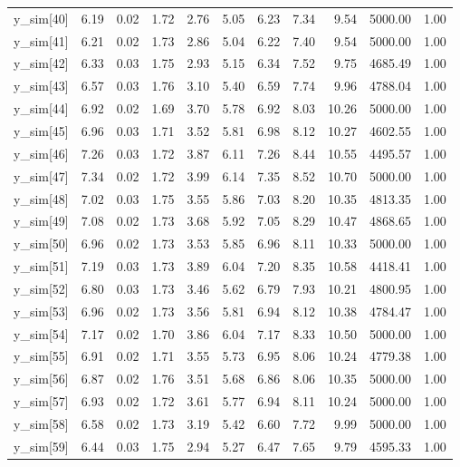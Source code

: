 \begin{table}[ht]
\begin{tabular}{rrrrrrrrrrr}
  y\_sim[40] & 6.19 & 0.02 & 1.72 & 2.76 & 5.05 & 6.23 & 7.34 & 9.54 & 5000.00 & 1.00 \\ 
  y\_sim[41] & 6.21 & 0.02 & 1.73 & 2.86 & 5.04 & 6.22 & 7.40 & 9.54 & 5000.00 & 1.00 \\ 
  y\_sim[42] & 6.33 & 0.03 & 1.75 & 2.93 & 5.15 & 6.34 & 7.52 & 9.75 & 4685.49 & 1.00 \\ 
  y\_sim[43] & 6.57 & 0.03 & 1.76 & 3.10 & 5.40 & 6.59 & 7.74 & 9.96 & 4788.04 & 1.00 \\ 
  y\_sim[44] & 6.92 & 0.02 & 1.69 & 3.70 & 5.78 & 6.92 & 8.03 & 10.26 & 5000.00 & 1.00 \\ 
  y\_sim[45] & 6.96 & 0.03 & 1.71 & 3.52 & 5.81 & 6.98 & 8.12 & 10.27 & 4602.55 & 1.00 \\ 
  y\_sim[46] & 7.26 & 0.03 & 1.72 & 3.87 & 6.11 & 7.26 & 8.44 & 10.55 & 4495.57 & 1.00 \\ 
  y\_sim[47] & 7.34 & 0.02 & 1.72 & 3.99 & 6.14 & 7.35 & 8.52 & 10.70 & 5000.00 & 1.00 \\ 
  y\_sim[48] & 7.02 & 0.03 & 1.75 & 3.55 & 5.86 & 7.03 & 8.20 & 10.35 & 4813.35 & 1.00 \\ 
  y\_sim[49] & 7.08 & 0.02 & 1.73 & 3.68 & 5.92 & 7.05 & 8.29 & 10.47 & 4868.65 & 1.00 \\ 
  y\_sim[50] & 6.96 & 0.02 & 1.73 & 3.53 & 5.85 & 6.96 & 8.11 & 10.33 & 5000.00 & 1.00 \\ 
  y\_sim[51] & 7.19 & 0.03 & 1.73 & 3.89 & 6.04 & 7.20 & 8.35 & 10.58 & 4418.41 & 1.00 \\ 
  y\_sim[52] & 6.80 & 0.03 & 1.73 & 3.46 & 5.62 & 6.79 & 7.93 & 10.21 & 4800.95 & 1.00 \\ 
  y\_sim[53] & 6.96 & 0.02 & 1.73 & 3.56 & 5.81 & 6.94 & 8.12 & 10.38 & 4784.47 & 1.00 \\ 
  y\_sim[54] & 7.17 & 0.02 & 1.70 & 3.86 & 6.04 & 7.17 & 8.33 & 10.50 & 5000.00 & 1.00 \\ 
  y\_sim[55] & 6.91 & 0.02 & 1.71 & 3.55 & 5.73 & 6.95 & 8.06 & 10.24 & 4779.38 & 1.00 \\ 
  y\_sim[56] & 6.87 & 0.02 & 1.76 & 3.51 & 5.68 & 6.86 & 8.06 & 10.35 & 5000.00 & 1.00 \\ 
  y\_sim[57] & 6.93 & 0.02 & 1.72 & 3.61 & 5.77 & 6.94 & 8.11 & 10.24 & 5000.00 & 1.00 \\ 
  y\_sim[58] & 6.58 & 0.02 & 1.73 & 3.19 & 5.42 & 6.60 & 7.72 & 9.99 & 5000.00 & 1.00 \\ 
  y\_sim[59] & 6.44 & 0.03 & 1.75 & 2.94 & 5.27 & 6.47 & 7.65 & 9.79 & 4595.33 & 1.00 \\ 

\end{tabular}
\end{table}
